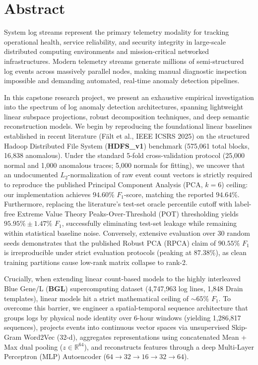 \chapter*{Abstract}

System log streams represent the primary telemetry modality for tracking operational health, service reliability, and security integrity in large-scale distributed computing environments and mission-critical networked infrastructures. Modern telemetry streams generate millions of semi-structured log events across massively parallel nodes, making manual diagnostic inspection impossible and demanding automated, real-time anomaly detection pipelines. 

In this capstone research project, we present an exhaustive empirical investigation into the spectrum of log anomaly detection architectures, spanning lightweight linear subspace projections, robust decomposition techniques, and deep semantic reconstruction models. We begin by reproducing the foundational linear baselines established in recent literature (F{\"a}lt et al., IEEE ICSRS 2025) on the structured Hadoop Distributed File System (\textbf{HDFS\_v1}) benchmark (575,061 total blocks, 16,838 anomalous). Under the standard 5-fold cross-validation protocol (25,000 normal and 1,000 anomalous traces; 5,000 normals for fitting), we uncover that an undocumented $L_2$-normalization of raw event count vectors is strictly required to reproduce the published Principal Component Analysis (PCA, $k=6$) ceiling: our implementation achieves $94.60\%$ $F_1$-score, matching the reported $94.64\%$. Furthermore, replacing the literature's test-set oracle percentile cutoff with label-free Extreme Value Theory Peaks-Over-Threshold (POT) thresholding yields $95.95\% \pm 1.47\%$ $F_1$, successfully eliminating test-set leakage while remaining within statistical baseline noise. Conversely, extensive evaluation over 30 random seeds demonstrates that the published Robust PCA (RPCA) claim of $90.55\%$ $F_1$ is irreproducible under strict evaluation protocols (peaking at $87.38\%$), as clean training partitions cause low-rank matrix collapse to rank-2.

Crucially, when extending linear count-based models to the highly interleaved Blue Gene/L (\textbf{BGL}) supercomputing dataset (4,747,963 log lines, 1,848 Drain templates), linear models hit a strict mathematical ceiling of $\sim 65\%$ $F_1$. To overcome this barrier, we engineer a spatial-temporal sequence architecture that groups logs by physical node identity over 6-hour windows (yielding 1,286,817 sequences), projects events into continuous vector spaces via unsupervised Skip-Gram Word2Vec (32-d), aggregates representations using concatenated Mean + Max dual pooling ($z \in \mathbb{R}^{64}$), and reconstructs features through a deep Multi-Layer Perceptron (MLP) Autoencoder ($64 \rightarrow 32 \rightarrow 16 \rightarrow 32 \rightarrow 64$).

